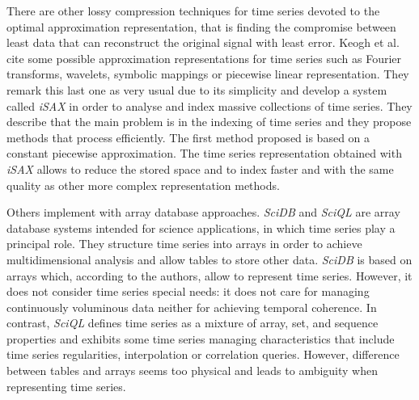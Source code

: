 There are other lossy compression techniques for time series devoted
to the optimal approximation representation, that is finding the
compromise between least data that can reconstruct the original signal
with least error. Keogh et al.\ \cite{keogh01} cite some possible
approximation representations for time series such as Fourier
transforms, wavelets, symbolic mappings or piecewise linear
representation. They remark this last one as very usual due to its
simplicity and develop a system called \emph{iSAX}
\cite{keogh08:isax,keogh10:isax} in order to analyse and index massive
collections of time series. They describe that the main problem is in
the indexing of time series and they propose methods that process
efficiently. The first method proposed is based on a constant
piecewise approximation. The time
series representation obtained with \emph{iSAX} allows to reduce the
stored space and to index faster and with the same quality as other
more complex representation methods.


 



 

 
Others implement  with array database approaches.
\emph{SciDB} \cite{stonebraker09:scidb} and \emph{SciQL}
\cite{zhang11} are array database systems intended for science
applications, in which time series play a principal role. They
structure time series into arrays in order to achieve multidimensional
analysis and allow tables to store other data.  \emph{SciDB} is based
on arrays which, according to the authors, allow to represent time
series. However, it does not consider time series special needs: it
does not care for managing continuously voluminous data neither for
achieving temporal coherence.  In contrast, \emph{SciQL} defines time
series as a mixture of array, set, and sequence properties and
exhibits some time series managing characteristics that include time
series regularities, interpolation or correlation queries.  However,
difference between tables and arrays seems too physical and leads to
ambiguity when representing time series.




